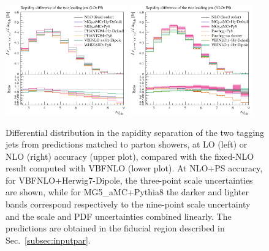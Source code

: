 \documentclass[twocolumn,epjc3]{svjour3} %
\newlength{\width}
\begin{document}
\begin{figure}
\centering
\includegraphics[width=0.47\textwidth]{figures/LOPS/Deltay_jj.pdf}
\includegraphics[width=0.47\textwidth]{figures/NLOPS/Deltay_jj.pdf}
\caption{Differential distribution in the
rapidity separation of the two tagging jets
from predictions matched to parton showers, at LO (left) or NLO (right) accuracy (upper plot), compared with the fixed-NLO result computed with {\sc VBFNLO} (lower plot). At NLO+PS accuracy, for
    {\sc VBFNLO}+{\sc Herwig7-Dipole}, the three-point scale uncertainties are shown, while for {\sc MG5\_aMC}+{\sc Pythia8} the darker and lighter bands correspond
    respectively to the nine-point scale uncertainty and the scale and PDF uncertainties combined linearly.
    The predictions are obtained in the fiducial region described in Sec.~\protect\ref{subsec:inputpar}.}
\label{fig:PSdyjj}
\end{figure}
\end{document}
